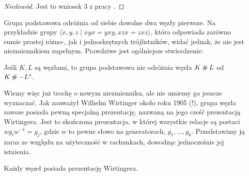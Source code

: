 \begin{proof}[Niedowód]
    Jest to wniosek 3 z pracy \cite{feustel78}.
\end{proof}

Grupa podstawowa odróżnia od siebie dowolne dwa węzły pierwsze.
Na przykładzie grupy $\langle x,y,z \mid xyx=yxy,xzx=zxz\rangle$,
która odpowiada zarówno sumie prostej różno-, jak i jednoskrętnych trójlistników,
widać jednak, że nie jest niezmiennikiem zupełnym.
Prawdziwe jest ogólniejsze stwierdzenie:

\begin{proposition}
    \label{prop:knot_group_sum}
    Jeśli $K, L$ są węzłami, to grupa podstawowa nie odróżnia węzła $K \mathbin{\#} L$ od $K \mathbin{\#} -L^*$.
\end{proposition}

Wiemy więc już trochę o nowym niezmienniku, ale nie umiemy go jeszcze wyznaczać.
Jak zauważył Wilhelm Wirtinger około roku 1905 (!),
grupa węzła zawsze posiada pewną specjalną prezentację,
nazwaną na jego cześć prezentacją Wirtingera.
Jest to skończona prezentacja, w której wszystkie relacje są postaci $w g_i w^{-1} = g_j$,
gdzie $w$ to pewne słowo na generatorach, $g_1, \ldots, g_k$.
Przedstawimy ją zaraz ze względu na użyteczność w rachunkach,
dowodząc jednocześnie jej istnienia.

\begin{proposition}
    \label{prop:wirtinger}
    Każdy węzeł posiada prezentację Wirtingera.
\end{proposition}


